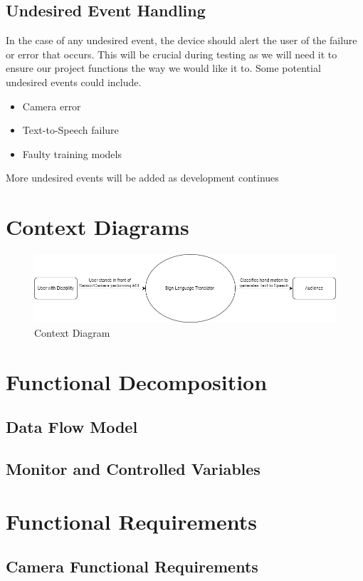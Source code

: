 \documentclass[12pt]{article}
\begin{document}
\subsection{Undesired Event Handling}
In the case of any undesired event, the device should alert the user of the failure or error 
that occurs. This will be crucial during testing as we will need it to ensure our project functions
the way we would like it to. Some potential undesired events could include.
\begin{itemize}
    \item Camera error
    \item Text-to-Speech failure
    \item Faulty training models
\end{itemize}
More undesired events will be added as development continues


\section{Context Diagrams}

\begin{figure}[H] 
\centering
\includegraphics[width=1\textwidth]{Context Diagram} 
\caption{Context Diagram} 
\label{Fig.Context_Diagram} 
\end{figure}

\section{Functional Decomposition}
\subsection{Data Flow Model}

\subsection{Monitor and Controlled Variables}

\section{Functional Requirements}
\subsection{Camera Functional Requirements}
\end{document}
